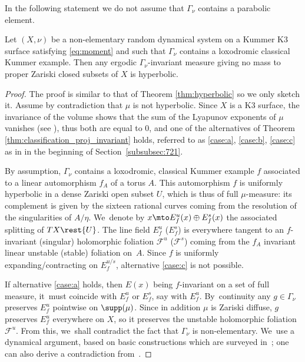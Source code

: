 In the following statement we do not assume that $\Gamma_\nu$ contains a parabolic element.

\begin{thm} \label{thm:hyperbolic_kummer}
Let $(X, \nu)$ be a non-elementary random dynamical system on a Kummer K3 surface satisfying
\eqref{eq:moment} and such that $\Gamma_\nu$ contains a loxodromic classical Kummer example. Then
any ergodic $\Gamma_\nu$-invariant
measure giving no mass to proper Zariski closed subsets of $X$ is hyperbolic.
\end{thm}

\begin{proof}
The proof is similar to that of Theorem \ref{thm:hyperbolic} so we only sketch it. Assume by contradiction that $\mu$ is
not hyperbolic. Since $X$ is a K3 surface, the invariance of the volume
shows that the sum of the Lyapunov exponents of $\mu$ vanishes (see \cite[\S 7.3]{stiffness}), thus both are
equal to $0$, and one of the alternatives of Theorem \ref{thm:classification_proj_invariant} holds, referred to as \eqref{case:a}, \eqref{case:b}, \eqref{case:c} as in in the beginning of Section~\ref{subsubsec:721}.

By assumption, $\Gamma_\nu$ contains a loxodromic, classical Kummer example $f$ associated to a linear automorphism $f_A$ of a torus $A$. This automorphism $f$ is uniformly
hyperbolic in a dense Zariski open subset $U$, which is thus of full $\mu$-measure: its complement is given by the sixteen rational curves
coming from the resolution of the singularities of $A/\eta$. We~denote by $x\mto E^u_f(x)\oplus E^s_f(x)$
the associated splitting of $TX\rest{U}$. The line field $E^u_f$ (\resp $E^s_f$) is everywhere tangent
to an $f$-invariant (singular) holomorphic foliation $\mathcal F^u$ (\resp $\mathcal F^s$) coming from the $f_A$ invariant linear unstable (\resp stable) foliation on~$A$.
Since $f$ is uniformly expanding/contracting on $E^{u/s}_f$, alternative \eqref{case:c} is not possible.

If alternative \eqref{case:a} holds, then $E(x)$ being $f$-invariant on a set of full
measure, it~must coincide with $E^u_f$ or $E^s_f$, say with $E^u_f$. By~continuity any $g\in \Gamma_\nu$ preserves
$E^u_f$ pointwise on $\supp(\mu)$.
Since in addition $\mu$ is Zariski diffuse, $g$
preserves $E^u_f$ everywhere on $X$, so it
preserves the unstable holomorphic foliation $\mathcal F^u$.
From this, we~shall contradict
the fact that $\Gamma_\nu$ is non-elementary. We~use a dynamical argument, based on basic constructions which are surveyed in~\cite{Cantat:Milnor}; one can also derive a contradiction from~\cite{Cantat-Favre}.


\end{proof}
